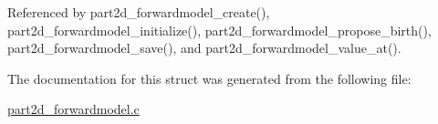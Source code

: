 Referenced by part2d\+\_\+forwardmodel\+\_\+create(), part2d\+\_\+forwardmodel\+\_\+initialize(), part2d\+\_\+forwardmodel\+\_\+propose\+\_\+birth(), part2d\+\_\+forwardmodel\+\_\+save(), and part2d\+\_\+forwardmodel\+\_\+value\+\_\+at().



The documentation for this struct was generated from the following file\+:\begin{DoxyCompactItemize}
\item 
\hyperlink{part2d__forwardmodel_8c}{part2d\+\_\+forwardmodel.\+c}\end{DoxyCompactItemize}
